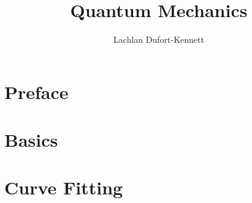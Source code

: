 \documentclass[12pt]{report}
\title{Quantum Mechanics}
\author{Lachlan Dufort-Kennett}
\theoremstyle{theorem}
\theoremstyle{def}
\begin{document}
    \maketitle
    \setcounter{tocdepth}{1}
    \tableofcontents

    \chapter*{Preface}

    \chapter{Basics}
    
    \chapter{Curve Fitting}
    

    \nocite{*}
    
    
\end{document}

